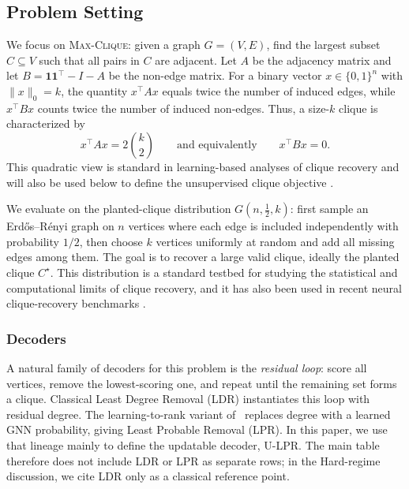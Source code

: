 \documentclass[mathematics,article,submit,pdftex,moreauthors]{Definitions/mdpi}
\begin{document}
\subsection{Problem Setting}
\label{sec:problem}

We focus on \textsc{Max-Clique}: given a graph $G=(V,E)$, find the largest subset
$C \subseteq V$ such that all pairs in $C$ are adjacent. Let $A$ be the adjacency
matrix and let $B=\mathbf{1}\mathbf{1}^{\top}-I-A$ be the non-edge matrix. For a
binary vector $x\in\{0,1\}^n$ with $\|x\|_0=k$, the quantity $x^\top A x$ equals
twice the number of induced edges, while $x^\top Bx$ counts twice the number of
induced non-edges. Thus, a size-$k$ clique is characterized by
\[
  x^\top A x = 2\binom{k}{2}
  \qquad\text{and equivalently}\qquad
  x^\top Bx = 0 .
\]
This quadratic view is standard in learning-based analyses of clique recovery and
will also be used below to define the unsupervised clique objective
\citep{ShohamHRV26,min2022,karalias2020}.

We evaluate on the planted-clique distribution $G(n,\tfrac{1}{2},k)$: first sample
an Erd\H{o}s--R\'enyi graph on $n$ vertices where each edge is included
independently with probability $1/2$, then choose $k$ vertices uniformly at random
and add all missing edges among them. The goal is to recover a large valid clique,
ideally the planted clique $C^\star$. This distribution is a standard testbed for
studying the statistical and computational limits of clique recovery, and it has
also been used in recent neural clique-recovery benchmarks
\citep{kucera1995,alon1998,feige2010,dekel2014,ShohamHRV26}.

\subsubsection{Decoders}

A natural family of decoders for this problem is the \emph{residual loop}: score all
vertices, remove the lowest-scoring one, and repeat until the remaining set forms a
clique. Classical Least Degree Removal (LDR) instantiates this loop with residual
degree. The learning-to-rank variant of~\citet{ShohamHRV26} replaces degree
with a learned GNN probability, giving Least Probable Removal (LPR). In this paper,
we use that lineage mainly to define the updatable decoder, U-LPR. The main table
therefore does not include LDR or LPR as separate rows; in the Hard-regime
discussion, we cite LDR only as a classical reference point.
\end{document}

